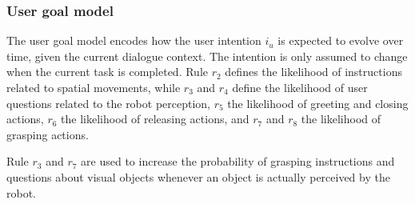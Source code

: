 \subsubsection*{User goal model}

The user goal model encodes how the user intention $i_u$ is expected to evolve over time, given the current dialogue context.  The intention is only assumed to change when the current task is completed. Rule $r_2$ defines the likelihood of instructions related to spatial movements, while $r_3$ and $r_4$ define the likelihood of user questions related to the robot perception, $r_5$ the likelihood of greeting and closing actions, $r_6$ the likelihood of releasing actions, and $r_7$ and $r_8$ the likelihood of grasping actions.

Rule $r_3$ and $r_7$ are used to increase the probability of grasping instructions and questions about visual objects whenever an object is actually perceived by the robot.

